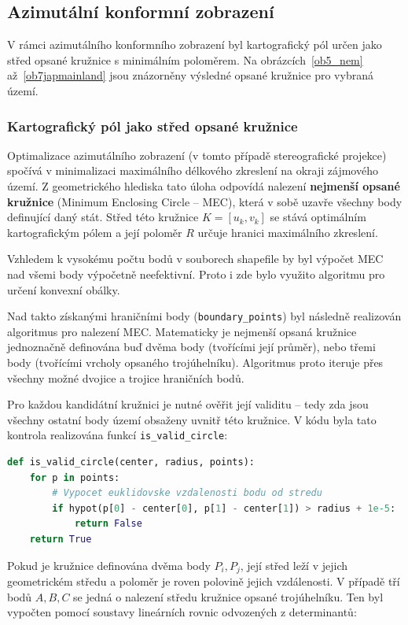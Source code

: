 \subsection{Azimutální konformní zobrazení}
V rámci azimutálního konformního zobrazení byl kartografický pól určen jako střed opsané kružnice s minimálním poloměrem. Na obrázcích~\ref{ob5_nem} až~\ref{ob7japmainland} jsou znázorněny výsledné opsané kružnice pro vybraná území.


\subsubsection*{Kartografický pól jako střed opsané kružnice}
Optimalizace azimutálního zobrazení (v tomto případě stereografické projekce) spočívá v minimalizaci maximálního délkového zkreslení na okraji zájmového území. Z geometrického hlediska tato úloha odpovídá nalezení \textbf{nejmenší opsané kružnice} (Minimum Enclosing Circle – MEC), která v sobě uzavře všechny body definující daný stát. Střed této kružnice $K = [u_k, v_k]$ se stává optimálním kartografickým pólem a její poloměr $R$ určuje hranici maximálního zkreslení.

Vzhledem k vysokému počtu bodů v souborech shapefile by byl výpočet MEC nad všemi body výpočetně neefektivní. Proto i zde bylo využito algoritmu pro určení konvexní obálky.


Nad takto získanými hraničními body (\lstinline{boundary_points}) byl následně realizován algoritmus pro nalezení MEC. Matematicky je nejmenší opsaná kružnice jednoznačně definována buď dvěma body (tvořícími její průměr), nebo třemi body (tvořícími vrcholy opsaného trojúhelníku). Algoritmus proto iteruje přes všechny možné dvojice a trojice hraničních bodů.

Pro každou kandidátní kružnici je nutné ověřit její validitu – tedy zda jsou všechny ostatní body území obsaženy uvnitř této kružnice. V kódu byla tato kontrola realizována funkcí \lstinline{is_valid_circle}:

\begin{lstlisting}[language=Python, caption=Kontrola validity kandidátní kružnice.]
def is_valid_circle(center, radius, points):
    for p in points:
        # Vypocet euklidovske vzdalenosti bodu od stredu
        if hypot(p[0] - center[0], p[1] - center[1]) > radius + 1e-5:
            return False
    return True
\end{lstlisting}

Pokud je kružnice definována dvěma body $P_i, P_j$, její střed leží v jejich geometrickém středu a poloměr je roven polovině jejich vzdálenosti. V případě tří bodů $A, B, C$ se jedná o nalezení středu kružnice opsané trojúhelníku. Ten byl vypočten pomocí soustavy lineárních rovnic odvozených z determinantů:

